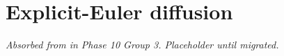 \chapter{Explicit-Euler diffusion}
\label{chap:explicit-euler}

\textit{Absorbed from 
in Phase 10 Group 3. Placeholder until migrated.}
